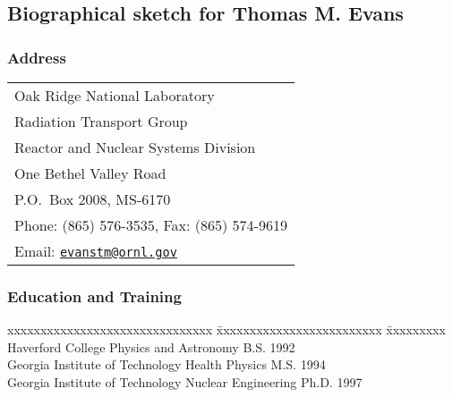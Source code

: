 
\subsection{Biographical sketch for Thomas M. Evans}

\subsubsection*{Address}
\begin{tabular}{l}
  Oak Ridge National Laboratory \\
  Radiation Transport Group\\
  Reactor and Nuclear Systems Division\\
  One Bethel Valley Road\\
  P.O.~Box 2008, MS-6170\\
  Phone:  (865) 576-3535, Fax:    (865) 574-9619	\\
  Email:  \href{mailto:evanstm@ornl.gov}{\texttt{evanstm@ornl.gov}}
\end{tabular}


\vspace*{-1ex}
\subsubsection*{Education and Training}
\vspace*{-1ex}
\begin{tabbing}
  \hspace*{1ex}
  xxxxxxxxxxxxxxxxxxxxxxxxxxxxxxx \= xxxxxxxxxxxxxxxxxxxxxxxxx \= xxxxxxxxx \kill
  Haverford College \> Physics and Astronomy \> B.S. 1992 \\
  Georgia Institute of Technology \> Health Physics \> M.S. 1994 \\
  Georgia Institute of Technology \> Nuclear Engineering \> Ph.D. 1997 
\end{tabbing}


\vspace*{-3ex}

